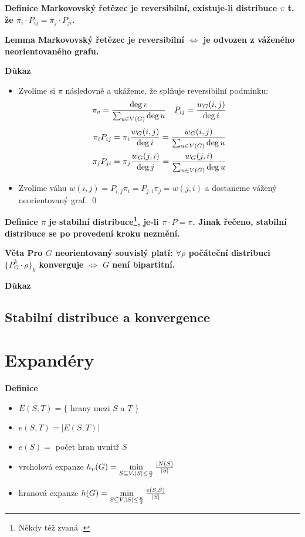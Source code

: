 \documentclass[a4paper,12pt,titlepage]{article}
\newcommand{\lm}{\smallskip\noindent\bf Lemma\rm{} }
\newcommand{\dk}{\smallskip\noindent\bf Důkaz\rm{} }
\newcommand{\df}{\smallskip\noindent\bf Definice\rm{} }
\newcommand{\vt}{\smallskip\noindent\bf Věta\rm{} }
\begin{document}
\df Markovovský řetězec je reversibilní, existuje-li distribuce $\pi$
t. že $\pi_i\cdot P_{ij} = \pi_j\cdot P_{ji}$.

\lm Markovovský řetězec je reversibilní $\Leftrightarrow$ je odvozen z váženého neorientovaného grafu.

\dk 
\begin{itemize}

\item[\uv{$\Leftarrow$}]
Zvolíme si $\pi$ následovně a ukážeme, že splňuje reversibilní podmínku:
\begin{align*}
& \pi_v = {\deg v\over \sum_{u\in V(G)} \deg u} & P_{ij} = {w_G(i,j)\over \deg i} \\ 
\end{align*}
\begin{align*}
\pi_i P_{ij} &= \pi_i {w_G(i,j)\over \deg i} = {w_G(i,j)\over \sum_{u\in V(G)}\deg u} \\
\pi_j P_{ji} &= \pi_j {w_G(j,i)\over \deg j} = {w_G(j,i)\over \sum_{u\in V(G)}\deg u}
\end{align*}

\item[\uv{$\Rightarrow$}]
Zvolíme váhu $w(i,j) = P_{i,j}\pi_i = P_{j,i}\pi_j = w(j,i)$ a dostaneme vážený
neorientovaný graf.
\qed
\end{itemize}

\df $\pi$ je stabilní distribuce\footnote{Někdy též zvaná .},
je-li $\pi\cdot P = \pi$. Jinak řečeno, stabilní distribuce se po provedení
kroku nezmění.

\vt Pro $G$ neorientovaný souvislý platí: $\forall \rho$ počáteční distribuci $\{P_G^k\cdot \rho\}_k$ konverguje $\Leftrightarrow$ $G$ není bipartitní.

\dk



\subsection{Stabilní distribuce a konvergence}

\section{Expandéry}

\df
\begin{itemize}
	\item $E(S,T) = \{$ hrany mezi $S$ a $T$ $\}$
	\item $e(S,T) = |E(S,T)|$
	\item $e(S) = $ počet hran uvnitř $S$
	\item vrcholová expanze $h_v(G) = \min\limits_{S\subseteq V, |S|\le {n\over 2}} {|N(S) \over |S|}$
	\item hranová expanze $h(G) = \min\limits_{S\subseteq V, |S|\le {n\over 2}} {e(S,\bar S) \over |S|}$
\end{itemize}
\end{document}
